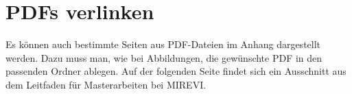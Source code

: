 \newpage
\section{PDFs verlinken}\label{cha:pdfLink}
Es können auch bestimmte Seiten aus PDF-Dateien im Anhang dargestellt werden. Dazu muss man, wie bei Abbildungen, die gewünschte PDF in den passenden Ordner ablegen. Auf der folgenden Seite findet sich ein Ausschnitt aus dem Leitfaden für Masterarbeiten bei MIREVI.



